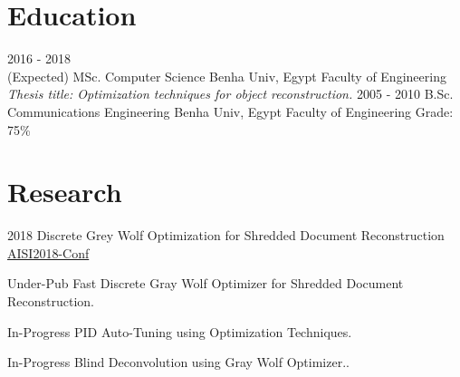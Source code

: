 \documentclass[letterpaper]{twentysecondcv} %
\begin{document}





\makeprofile %

\section{Education}

\begin{twenty} %
	\twentyitem
    	{2016 - 2018 \\ (Expected)}
        {MSc. Computer Science}
    	{Benha Univ, Egypt}
        {Faculty of Engineering}
        {\textit{Thesis title: Optimization techniques for object reconstruction.}}
	\twentyitem
    	{2005 - 2010}
        {B.Sc. Communications Engineering}
        {Benha Univ, Egypt}
        {Faculty of Engineering}
        {Grade: 75\%}
\end{twenty}

\section{Research}
\begin{twenty}
	\twentyitem
    	{2018}
        {Discrete Grey Wolf Optimization for Shredded Document Reconstruction}       {\href{http://egyptscience.net/AISI2018/home.html}{AISI2018-Conf}}{}
        {
    }
    
	\twentyitem
    	{Under-Pub}
        {Fast Discrete Gray Wolf Optimizer for Shredded Document Reconstruction.}
        {}{}{}{}
        
	\twentyitem
    	{In-Progress}
        {PID Auto-Tuning using Optimization Techniques.}
        {}{}{}{}
        
	\twentyitem
    	{In-Progress}
        {Blind Deconvolution using Gray Wolf Optimizer..}
        {}{}{}{}
        
\end{twenty}
\end{document}

